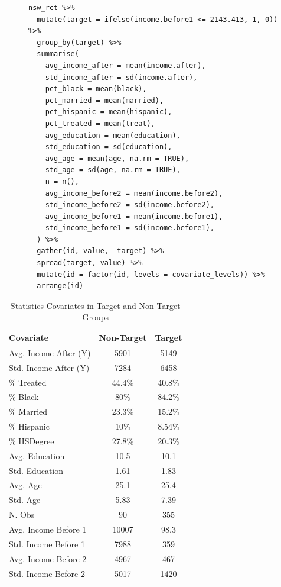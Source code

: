 \documentclass{article}
\begin{document}
\begin{figure}[H]
\centering
\begin{lstlisting}[style=Rstyle, caption=Data Statistics Code]
nsw_rct %>% 
  mutate(target = ifelse(income.before1 <= 2143.413, 1, 0)) %>% 
  group_by(target) %>% 
  summarise(
    avg_income_after = mean(income.after),
    std_income_after = sd(income.after),
    pct_black = mean(black),
    pct_married = mean(married),
    pct_hispanic = mean(hispanic),
    pct_treated = mean(treat),
    avg_education = mean(education),
    std_education = sd(education),
    avg_age = mean(age, na.rm = TRUE),
    std_age = sd(age, na.rm = TRUE),
    n = n(),
    avg_income_before2 = mean(income.before2),
    std_income_before2 = sd(income.before2),
    avg_income_before1 = mean(income.before1),
    std_income_before1 = sd(income.before1),
  ) %>% 
  gather(id, value, -target) %>% 
  spread(target, value) %>% 
  mutate(id = factor(id, levels = covariate_levels)) %>% 
  arrange(id)
\end{lstlisting}
\end{figure}

\begin{table}[H]
    \centering
    \begin{tabular}{|l|c|c|}
    \hline
    \textbf{Covariate} & \textbf{Non-Target} & \textbf{Target} \\
    \hline
    Avg. Income After (Y)  & 5901 & 5149 \\   
    Std. Income After (Y)  & 7284 & 6458 \\  
    \% Treated             & 44.4\% & 40.8\% \\ 
    \% Black               & 80\%   & 84.2\% \\ 
    \% Married             & 23.3\% & 15.2\% \\ 
    \% Hispanic            & 10\%   & 8.54\% \\
    \% HSDegree            & 27.8\%   & 20.3\% \\
    Avg. Education         & 10.5  & 10.1 \\   
    Std. Education         & 1.61  & 1.83 \\  
    Avg. Age               & 25.1  & 25.4 \\   
    Std. Age               & 5.83  & 7.39 \\  
    N. Obs                 & 90    & 355 \\
    Avg. Income Before 1   & 10007 & 98.3 \\   
    Std. Income Before 1   & 7988 & 359 \\  
    Avg. Income Before 2   & 4967 & 467 \\   
    Std. Income Before 2   & 5017 & 1420 \\  
    \hline
    \end{tabular}
    \caption{Statistics Covariates in Target and Non-Target Groups}
    \label{tab:earnings_distribution}
\end{table}
\end{document}
